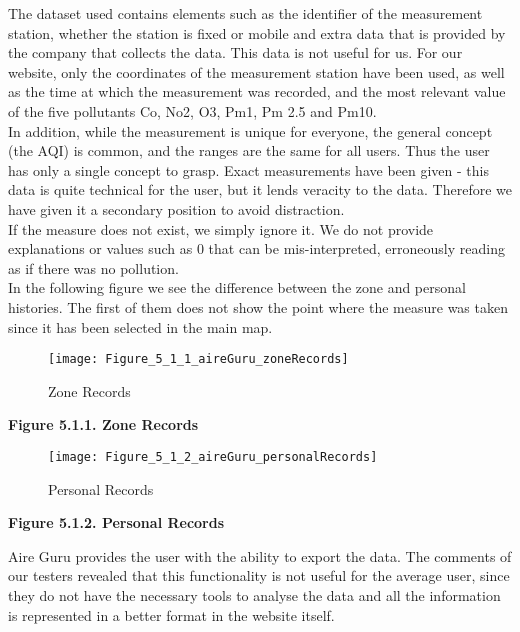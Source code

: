 The dataset used contains elements such as the identifier of the measurement station, whether the station is fixed or mobile
and extra data that is provided by the company that collects the data. This data is not useful for us.
For our website, only the coordinates of the measurement station have been used, as well as the time at which the measurement was recorded,
and the most relevant value of the five pollutants Co, No2, O3, Pm1, Pm 2.5 and Pm10.\\

In addition, while the measurement is unique for everyone, the general concept (the AQI) is common, and the ranges are the same for all users.
Thus the user has only a single concept to grasp. Exact measurements have been given - this data is quite technical for the user, but 
it lends veracity to the data. Therefore we have given it a secondary position to avoid distraction.\\

If the measure does not exist, we simply ignore it. We do not provide explanations or values such as 0 that can be mis-interpreted, erroneously reading as if there was no pollution.\\

In the following figure we see the difference between the zone and personal histories. The first of them does not show
the point where the measure was taken since it has been selected in the main map.\\


\begin{figure}[ht]
    \centering
    \texttt{[image: Figure\_5\_1\_1\_aireGuru\_zoneRecords]}
    \caption{ Zone Records}
\end{figure}
\begin{center}
    \bf{ 
    Figure 5.1.1. Zone Records}
\end{center}

\begin{figure}[ht]
    \centering
    \texttt{[image: Figure\_5\_1\_2\_aireGuru\_personalRecords]}
    \caption{ Personal Records}
\end{figure}
\begin{center}
    \bf{ 
    Figure 5.1.2. Personal Records}
\end{center}

Aire Guru provides the user with the ability to export the data. The comments of our testers revealed
that this functionality is not useful for the average user, since they do not have the necessary tools to
analyse the data and all the information is represented in a better format in the website itself.
